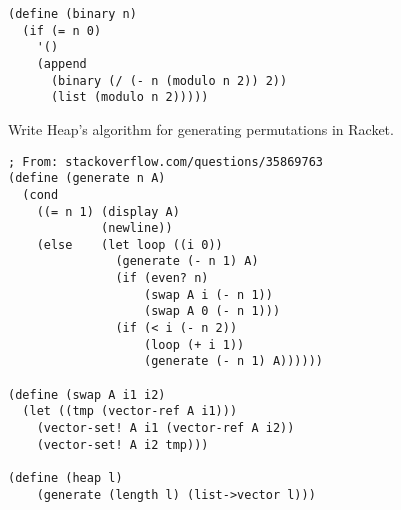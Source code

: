 \begin{questions}
\begin{solution}
  \begin{verbatim}
(define (binary n)
  (if (= n 0)
    '()
    (append
      (binary (/ (- n (modulo n 2)) 2))
      (list (modulo n 2)))))
  \end{verbatim}
\end{solution}

\question
Write Heap's algorithm for generating permutations in Racket.

\begin{solution}
  \begin{verbatim}
; From: stackoverflow.com/questions/35869763
(define (generate n A)
  (cond
    ((= n 1) (display A)
             (newline))
    (else    (let loop ((i 0))
               (generate (- n 1) A)
               (if (even? n)
                   (swap A i (- n 1))
                   (swap A 0 (- n 1)))
               (if (< i (- n 2))
                   (loop (+ i 1))
                   (generate (- n 1) A))))))

(define (swap A i1 i2)
  (let ((tmp (vector-ref A i1)))
    (vector-set! A i1 (vector-ref A i2))
    (vector-set! A i2 tmp)))

(define (heap l)
	(generate (length l) (list->vector l)))
  \end{verbatim}
\end{solution}

\end{questions}
